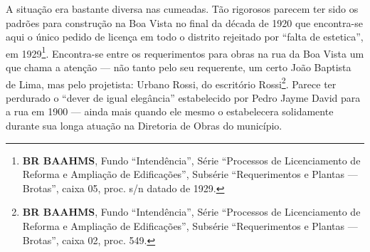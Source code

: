 A situação era bastante diversa nas cumeadas. Tão rigorosos parecem ter sido os padrões para construção na Boa Vista no final da década de 1920 que encontra-se aqui o único pedido de licença em todo o distrito rejeitado por ``falta de estetica'', em 1929\footnote{\textbf{BR BAAHMS}, Fundo ``Intendência'', Série ``Processos de Licenciamento de Reforma e Ampliação de Edificações'', Subsérie ``Requerimentos e Plantas --- Brotas'', caixa 05, proc. s/n datado de 1929.}. Encontra-se entre os requerimentos para obras na rua da Boa Vista um que chama a atenção --- não tanto pelo seu requerente, um certo João Baptista de Lima, mas pelo projetista: Urbano Rossi, do escritório Rossi\footnote{\textbf{BR BAAHMS}, Fundo ``Intendência'', Série ``Processos de Licenciamento de Reforma e Ampliação de Edificações'', Subsérie ``Requerimentos e Plantas --- Brotas'', caixa 02, proc. 549.}. Parece ter perdurado o ``dever de igual elegância'' estabelecido por Pedro Jayme David para a rua em 1900 --- ainda mais quando ele mesmo o estabelecera solidamente durante sua longa atuação na Diretoria de Obras do município.

